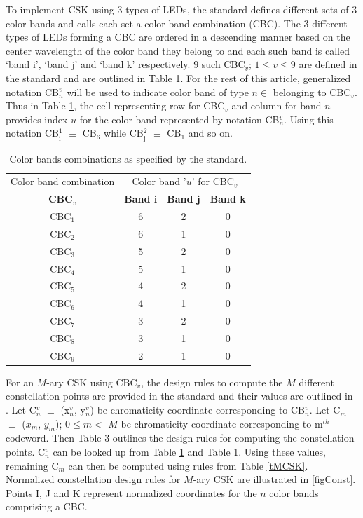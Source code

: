 \documentclass[10pt,letterpaper]{article}
\begin{document}
To implement CSK using 3 types of LEDs, the standard defines different
sets of 3 color bands and calls each set a color band combination
(CBC). The 3 different types of LEDs forming a CBC are ordered in a
descending manner based on the center wavelength of the color band
they belong to and each such band is called `band i', `band j' and
`band k' respectively. 9 such CBC$_{v}$; $1\leq v\leq 9$ are defined
in the standard and are outlined in Table \ref{tCBC}. For the rest of
this article, generalized notation CB$^{v}_{n}$ will be used to
indicate color band of type $n\in$  belonging to CBC$_{v}$. Thus in Table \ref{tCBC}, the cell representing row for CBC$_{v}$ and column for band $n$ provides index $u$ for the color band represented by notation CB$^{v}_{n}$.
Using this notation CB$^{1}_{\text{i}}$ $\equiv$ CB$_{6}$ while CB$^{2}_{\text{j}}$ $\equiv$ CB$_{1}$ and so on.

\begin{table}[b]
\centering
\begin{tabular}{|c|c|c|c|}
\hline
Color band combination & \multicolumn{3}{c|}{Color band '$u$' for CBC$_{v}$} \\
\cline{2-4}
\textbf{CBC$_{v}$} & \textbf{Band i} & \textbf{Band j} & \textbf{Band k} \\
\hline
CBC$_{1}$ & 6 & 2 & 0 \\
\hline
CBC$_{2}$ & 6 & 1 & 0 \\
\hline
CBC$_{3}$ & 5 & 2 & 0 \\
\hline
CBC$_{4}$ & 5 & 1 & 0 \\
\hline
CBC$_{5}$ & 4 & 2 & 0 \\
\hline
CBC$_{6}$ & 4 & 1 & 0 \\
\hline
CBC$_{7}$ & 3 & 2 & 0 \\
\hline
CBC$_{8}$ & 3 & 1 & 0 \\
\hline
CBC$_{9}$ & 2 & 1 & 0 \\
\hline
\end{tabular}
\caption{Color bands combinations as specified by the standard.}
\label{tCBC}
\end{table}

For an $M$-ary CSK using CBC$_{v}$, the design rules to compute the $M$ different constellation points are provided in the standard and their values are outlined in \cite{cskxy}. Let C$^{v}_{n}$ $\equiv$ (x$^{v}_{n}$, y$^{v}_{n}$) be chromaticity coordinate corresponding to CB$^{v}_{n}$. Let C$_{m}$ $\equiv$ ($x_{m}$, $y_{m}$); $0\leq m <$ $M$ be chromaticity coordinate corresponding to m$^{th}$ codeword. Then Table 3 outlines the design rules for computing the constellation points. C$^{v}_{n}$ can be looked up from Table \ref{tCBC} and Table 1. Using these values, remaining C$_{m}$ can then be computed using rules from Table \ref{tMCSK}. Normalized constellation design rules for $M$-ary CSK are illustrated in \figurename{ }\ref{figConst}. Points I, J and K represent normalized coordinates for the $n$ color bands comprising a CBC. 
\end{document}
